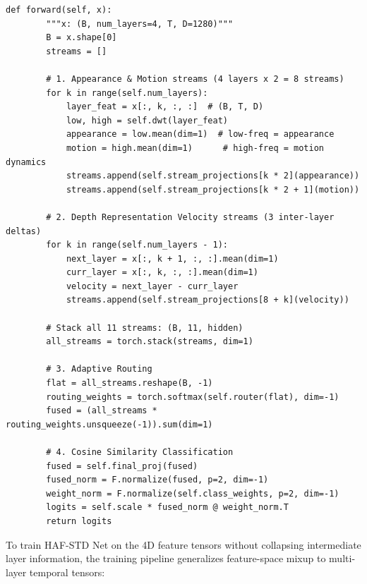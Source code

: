 \begin{lstlisting}[caption={HAF-STD Net architecture and spectral-temporal decomposition (HMDB51 configuration).}, label={lst:hafstd_arch_impl}]
    def forward(self, x):
        """x: (B, num_layers=4, T, D=1280)"""
        B = x.shape[0]
        streams = []

        # 1. Appearance & Motion streams (4 layers x 2 = 8 streams)
        for k in range(self.num_layers):
            layer_feat = x[:, k, :, :]  # (B, T, D)
            low, high = self.dwt(layer_feat)
            appearance = low.mean(dim=1)  # low-freq = appearance
            motion = high.mean(dim=1)      # high-freq = motion dynamics
            streams.append(self.stream_projections[k * 2](appearance))
            streams.append(self.stream_projections[k * 2 + 1](motion))

        # 2. Depth Representation Velocity streams (3 inter-layer deltas)
        for k in range(self.num_layers - 1):
            next_layer = x[:, k + 1, :, :].mean(dim=1)
            curr_layer = x[:, k, :, :].mean(dim=1)
            velocity = next_layer - curr_layer
            streams.append(self.stream_projections[8 + k](velocity))

        # Stack all 11 streams: (B, 11, hidden)
        all_streams = torch.stack(streams, dim=1)

        # 3. Adaptive Routing
        flat = all_streams.reshape(B, -1)
        routing_weights = torch.softmax(self.router(flat), dim=-1)
        fused = (all_streams * routing_weights.unsqueeze(-1)).sum(dim=1)

        # 4. Cosine Similarity Classification
        fused = self.final_proj(fused)
        fused_norm = F.normalize(fused, p=2, dim=-1)
        weight_norm = F.normalize(self.class_weights, p=2, dim=-1)
        logits = self.scale * fused_norm @ weight_norm.T
        return logits
\end{lstlisting}

To train HAF-STD Net on the 4D feature tensors without collapsing intermediate layer information, the training pipeline generalizes feature-space mixup to multi-layer temporal tensors:


